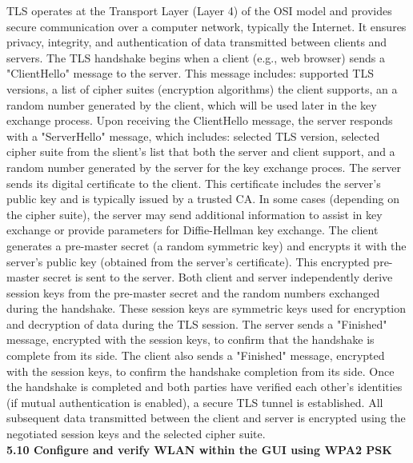 \documentclass{article}
\begin{document}
	TLS operates at the Transport Layer (Layer 4) of the OSI model and provides secure communication over a computer network, typically the Internet. It ensures privacy, integrity, and authentication of data transmitted between clients and servers. The TLS handshake begins when a client (e.g., web browser) sends a "ClientHello" message to the server. This message includes: supported TLS versions, a list of cipher suites (encryption algorithms) the client supports, an a random number generated by the client, which will be used later in the key exchange process. Upon receiving the ClientHello message, the server responds with a "ServerHello" message, which includes: selected TLS version, selected cipher suite from the slient's list that both the server and client support, and a random number generated by the server for the key exchange proces. The server sends its digital certificate to the client. This certificate includes the server's public key and is typically issued by a trusted CA. In some cases (depending on the cipher suite), the server may send additional information to assist in key exchange or provide parameters for Diffie-Hellman key exchange. The client generates a pre-master secret (a random symmetric key) and encrypts it with the server's public key (obtained from the server's certificate). This encrypted pre-master secret is sent to the server. Both client and server independently derive session keys from the pre-master secret and the random numbers exchanged during the handshake. These session keys are symmetric keys used for encryption and decryption of data during the TLS session. The server sends a "Finished" message, encrypted with the session keys, to confirm that the handshake is complete from its side. The client also sends a "Finished" message, encrypted with the session keys, to confirm the handshake completion from its side. Once the handshake is completed and both parties have verified each other's identities (if mutual authentication is enabled), a secure TLS tunnel is established. All subsequent data transmitted between the client and server is encrypted using the negotiated session keys and the selected cipher suite.\\
  
\noindent\textbf{5.10 Configure and verify WLAN within the GUI using WPA2 PSK}\\
\end{document}
